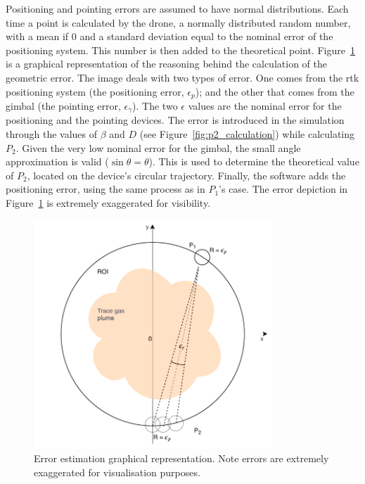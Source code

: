 Positioning and pointing errors are assumed to have normal
distributions. Each time a point is calculated by the drone, a normally
distributed random number, with a mean if 0 and a standard deviation
equal to the nominal error of the positioning system. This number is
then added to the theoretical point.
Figure~\ref{fig:geometric_error_calculation} is a graphical
representation of the reasoning behind the calculation of the geometric
error. The image deals with two types of error. One comes from the
\gls{rtk} positioning system (the positioning error, $\epsilon_p$); and
the other that comes from the gimbal (the pointing error,
$\epsilon_\gamma$). The two $\epsilon$ values are the nominal error for
the positioning and the pointing devices. The error is introduced in the
simulation through the values of $\beta$ and $D$ (see
Figure~\ref{fig:p2_calculation}) while calculating $P_2$. Given the very
low nominal error for the gimbal, the small angle approximation is valid
($\sin \theta = \theta$). This is used to determine the theoretical
value of $P_2$, located on the device's circular trajectory. Finally,
the software adds the positioning error, using the same process as in
$P_1$'s case. The error depiction in
Figure~\ref{fig:geometric_error_calculation} is extremely exaggerated
for visibility.

\begin{figure}[htpb]
    \centering
    \includegraphics[width=0.8\textwidth]{img/pdf/error_estimation_2.pdf}
    \caption{Error estimation graphical representation. Note errors are
    extremely exaggerated for visualisation purposes.}
    \label{fig:geometric_error_calculation}
\end{figure}

